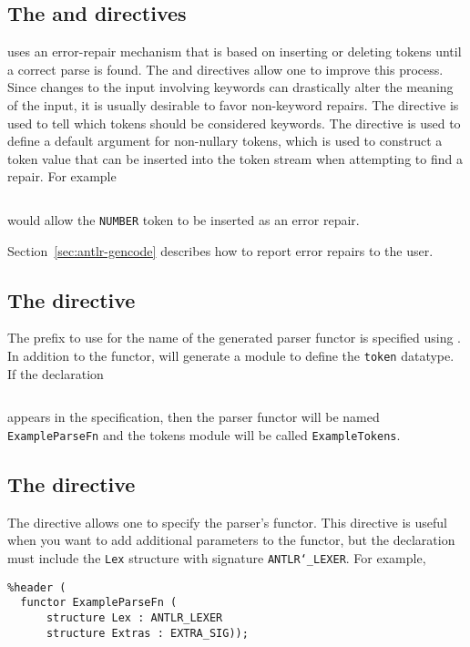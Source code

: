 \subsection{The  and  directives}

\Antlr{} uses an error-repair mechanism that is based on inserting or deleting tokens until
a correct parse is found.
The  and  directives allow one to improve this process.
Since changes to the input involving keywords can drastically alter the meaning of the
input, it is usually desirable to favor non-keyword repairs.
The  directive is used to tell \antlr{} which tokens should be considered keywords.
The  directive is used to define a default argument for non-nullary tokens, which
is used to construct a token value that can be inserted into the token stream
when attempting to find a repair.
For example
\begin{lstlisting}[language=MLAntlr]
    %value NUMBER(0);
\end{lstlisting}%
would allow the \texttt{NUMBER} token to be inserted as an error repair.

Section~\ref{sec:antlr-gencode} describes how to report error repairs to the user.

\subsection{The  directive}

The prefix to use for the name of the generated parser functor is specified using .
In addition to the functor, \antlr{} will generate a module to define the \texttt{token} datatype.
If the declaration
\begin{lstlisting}[language=MLAntlr]
    %name Example;
\end{lstlisting}%
appears in the specification, then the parser functor will be named
\texttt{ExampleParseFn} and the tokens module will be called \texttt{ExampleTokens}.

\subsection{The  directive}
The  directive allows one to specify the parser's functor.
This directive is useful when you want to add additional parameters to the functor,
but the declaration must include the \texttt{Lex} structure with signature
\texttt{ANTLR\char`\_LEXER}.
For example,
\begin{lstlisting}
%header (
  functor ExampleParseFn (
      structure Lex : ANTLR_LEXER
      structure Extras : EXTRA_SIG));
\end{lstlisting}%

